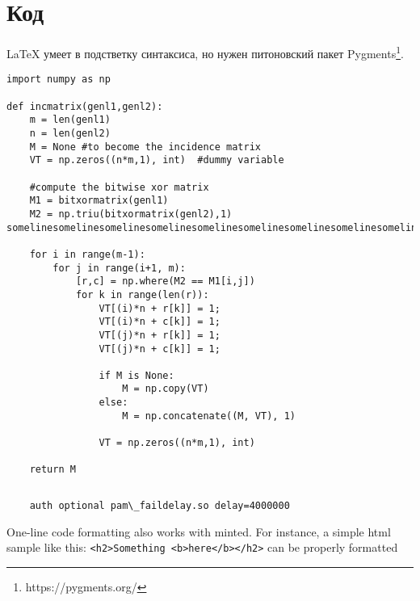\section{Код}

\LaTeX{} умеет в подстветку синтаксиса,
но нужен питоновский пакет Pygments\footnote{https://pygments.org/}.

\begin{verbatim}
import numpy as np
    
def incmatrix(genl1,genl2):
    m = len(genl1)
    n = len(genl2)
    M = None #to become the incidence matrix
    VT = np.zeros((n*m,1), int)  #dummy variable
    
    #compute the bitwise xor matrix
    M1 = bitxormatrix(genl1)
    M2 = np.triu(bitxormatrix(genl2),1) 
somelinesomelinesomelinesomelinesomelinesomelinesomelinesomelinesomelinesomeline,somelinesomelinesomelinesomelinesomelinesomelinesomelinesomelinesomelinesomeline

    for i in range(m-1):
        for j in range(i+1, m):
            [r,c] = np.where(M2 == M1[i,j])
            for k in range(len(r)):
                VT[(i)*n + r[k]] = 1;
                VT[(i)*n + c[k]] = 1;
                VT[(j)*n + r[k]] = 1;
                VT[(j)*n + c[k]] = 1;
                
                if M is None:
                    M = np.copy(VT)
                else:
                    M = np.concatenate((M, VT), 1)
                
                VT = np.zeros((n*m,1), int)
    
    return M
\end{verbatim}

\begin{listing}[H]
\caption{example.c}\label{lst:example}
\inputminted{c}{inc/example.c}
\end{listing}

\begin{listing}[H]
\caption*{/etc/pam.d/system-login}
    \begin{verbatim}
    auth optional pam\_faildelay.so delay=4000000
\end{verbatim}
\end{listing}

One-line code formatting also works with minted. For instance, a simple html 
sample like this:
\texttt{<h2>Something <b>here</b></h2>}
can be properly 
formatted
